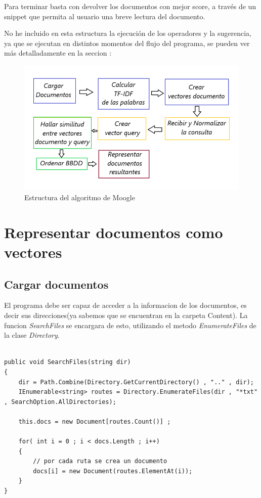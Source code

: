 \documentclass{article}
\begin{document}
Para terminar basta con devolver los documentos con mejor score, a través de un snippet que permita al usuario una breve lectura del documento.

No he incluido en esta estructura la ejecución de los operadores y la sugerencia, ya que se ejecutan en distintos momentos del flujo del programa, se pueden ver más 
detalladamente en la seccion : %

\begin{center}
    
\begin{figure}[ht]
    \label{fig : struct}
    \includegraphics[width = 12cm]{./../images/struct.png}
    \caption{Estructura del algoritmo de Moogle}
\end{figure}
\end{center}

\newpage

\section{Representar documentos como vectores} \label{sec : vectores doc}

\subsection{Cargar documentos}\label{sec : load docs}
El programa debe ser capaz de acceder a la informacion de los documentos, es decir sus direcciones(ya sabemos que se encuentran en la carpeta Content).
La funcion \textit{SearchFiles} se encargara de esto, utilizando el metodo \textit{EnumerateFiles} de la clase \textit{Directory}.

\begin{lstlisting}
    
public void SearchFiles(string dir)
{
    dir = Path.Combine(Directory.GetCurrentDirectory() , ".." , dir);
    IEnumerable<string> routes = Directory.EnumerateFiles(dir , "*txt" , SearchOption.AllDirectories);
        
    this.docs = new Document[routes.Count()] ;
        
    for( int i = 0 ; i < docs.Length ; i++)
    {
        // por cada ruta se crea un documento
        docs[i] = new Document(routes.ElementAt(i));
    }
}

    
\end{lstlisting}
\end{document}
